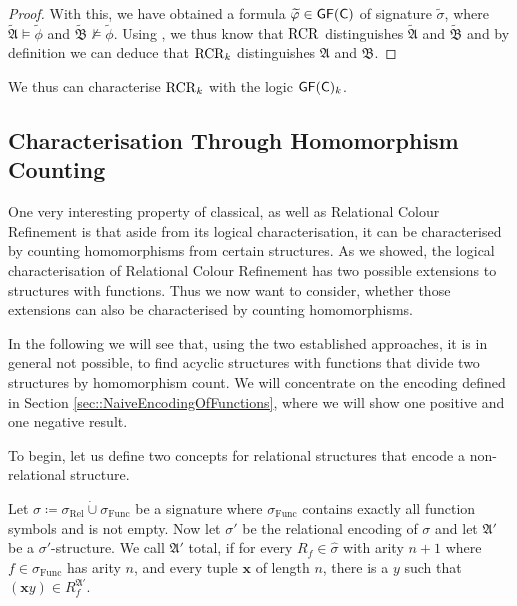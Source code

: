 \begin{proof}
	With this, we have obtained a formula $\widetilde{\varphi}\in\mathsf{GF}(\mathsf{C})$ of signature $\widetilde{\sigma}$, where $\widetilde{\mathfrak A}\models \widetilde{\phi}$ and $\widetilde{\mathfrak B}\not\models \widetilde{\phi}$.
	Using \cite{scheidt2025ColorRefinement}, we thus know that $\operatorname{RCR}$ distinguishes $\widetilde{\mathfrak A}$ and $\widetilde{\mathfrak B}$ and by definition we can deduce that $\operatorname{RCR}_k$ distinguishes $\mathfrak A$ and $\mathfrak B$.
\end{proof}

We thus can characterise $\operatorname{RCR}_k$ with the logic $\mathsf{GF}(\mathsf{C})_k$.

\subsection{Characterisation Through Homomorphism Counting}
\label{sec:RCRwithFnHomCount}

One very interesting property of classical, as well as Relational Colour Refinement is that aside from its logical characterisation, it can be characterised by counting homomorphisms from certain structures.
As we showed, the logical characterisation of Relational Colour Refinement has two possible extensions to structures with functions.
Thus we now want to consider, whether those extensions can also be characterised by counting homomorphisms.

In the following we will see that, using the two established approaches, it is in general not possible, to find acyclic structures with functions that divide two structures by homomorphism count.
We will concentrate on the encoding defined in Section \ref{sec::NaiveEncodingOfFunctions}, where we will show one positive and one negative result.

To begin, let us define two concepts for relational structures that encode a non-relational structure.

\begin{definition}
	\label{def:TotalStructures}
	Let $\sigma\coloneqq \sigma_{\operatorname{Rel}} \operatorname{\dot{\cup}} \sigma_{\operatorname{Func}}$ be a signature where $\sigma_{\operatorname{Func}}$ contains exactly all function symbols and is not empty.
	Now let $\sigma'$ be the relational encoding of $\sigma$ and let $\mathfrak A'$ be a $\sigma'$-structure.
	We call $\mathfrak A'$ total, if for every $R_{f}\in\widehat{\sigma}$ with arity $n+1$ where $f\in \sigma_{\operatorname{Func}}$ has arity $n$, and every tuple $\mathbf x$ of length $n$, there is a $y$ such that $(\mathbf xy)\in R^{\mathfrak A'}_{f}$.
\end{definition}


